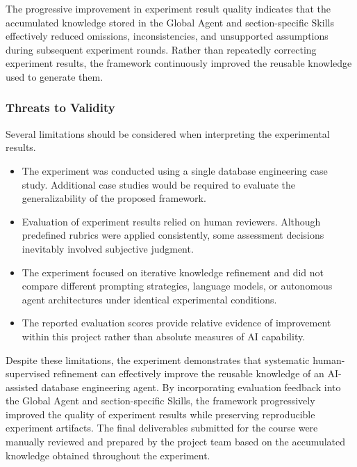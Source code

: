 The progressive improvement in experiment result quality indicates that the accumulated knowledge stored in the Global Agent and section-specific Skills effectively reduced omissions, inconsistencies, and unsupported assumptions during subsequent experiment rounds. Rather than repeatedly correcting experiment results, the framework continuously improved the reusable knowledge used to generate them.

\subsubsection{Threats to Validity}

Several limitations should be considered when interpreting the experimental results.

\begin{itemize}

\item The experiment was conducted using a single database engineering case study. Additional case studies would be required to evaluate the generalizability of the proposed framework.

\item Evaluation of experiment results relied on human reviewers. Although predefined rubrics were applied consistently, some assessment decisions inevitably involved subjective judgment.

\item The experiment focused on iterative knowledge refinement and did not compare different prompting strategies, language models, or autonomous agent architectures under identical experimental conditions.

\item The reported evaluation scores provide relative evidence of improvement within this project rather than absolute measures of AI capability.

\end{itemize}

Despite these limitations, the experiment demonstrates that systematic human-supervised refinement can effectively improve the reusable knowledge of an AI-assisted database engineering agent. By incorporating evaluation feedback into the Global Agent and section-specific Skills, the framework progressively improved the quality of experiment results while preserving reproducible experiment artifacts. The final deliverables submitted for the course were manually reviewed and prepared by the project team based on the accumulated knowledge obtained throughout the experiment.
